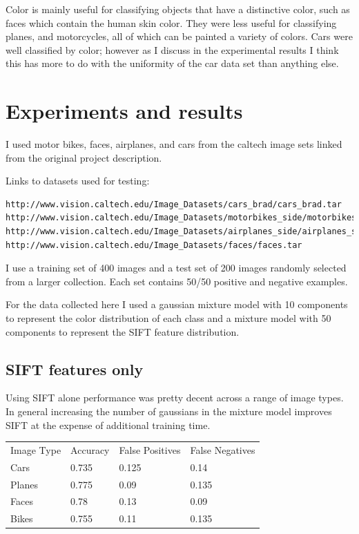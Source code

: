 \documentclass[11pt]{article}
\begin{document}
Color is mainly useful for classifying objects that have a distinctive
color, such as faces which contain the human skin color. They were
less useful for classifying planes, and motorcycles, all of which can
be painted a variety of colors. Cars were well classified by color;
however as I discuss in the experimental results I think this has more
to do with the uniformity of the car data set than anything else.

\section{Experiments and results}

I used motor bikes, faces, airplanes, and cars from the caltech image
sets linked from the original project description. 

Links to datasets used for testing:
\begin{verbatim}
http://www.vision.caltech.edu/Image_Datasets/cars_brad/cars_brad.tar
http://www.vision.caltech.edu/Image_Datasets/motorbikes_side/motorbikes_side.tar
http://www.vision.caltech.edu/Image_Datasets/airplanes_side/airplanes_side.tar
http://www.vision.caltech.edu/Image_Datasets/faces/faces.tar
\end{verbatim}

I use a training set of 400 images and a test set of 200 images
randomly selected from a larger collection. Each set contains 50/50
positive and negative examples.

For the data collected here I used a gaussian mixture model with 10
components to represent the color distribution of each class and a
mixture model with 50 components to represent the SIFT feature
distribution.

\subsection{SIFT features only}

Using SIFT alone performance was pretty decent across a range of image
types. In general increasing the number of gaussians in the mixture
model improves SIFT at the expense of additional training time.

\begin{tabular}{| l | l | l | l |}
  \hline
  Image Type & Accuracy     & False Positives    & False Negatives \\
  Cars      & 0.735 & 0.125 & 0.14  \\
  Planes    & 0.775 & 0.09  & 0.135 \\
  Faces     & 0.78  & 0.13  & 0.09  \\
  Bikes     & 0.755 & 0.11  & 0.135 \\
  \hline
\end{tabular}
\end{document}
